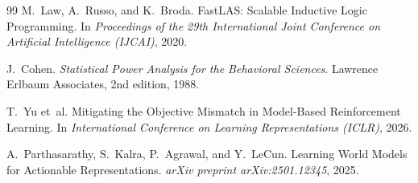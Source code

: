 \documentclass[11pt,a4paper]{article}
\theoremstyle{definition}
\begin{document}
\begin{thebibliography}{99}
M.~Law, A.~Russo, and K.~Broda.
\newblock FastLAS: Scalable Inductive Logic Programming.
\newblock In \emph{Proceedings of the 29th International Joint Conference on Artificial Intelligence (IJCAI)}, 2020.

J.~Cohen.
\newblock \emph{Statistical Power Analysis for the Behavioral Sciences}.
\newblock Lawrence Erlbaum Associates, 2nd edition, 1988.

T.~Yu et~al.
\newblock Mitigating the Objective Mismatch in Model-Based Reinforcement Learning.
\newblock In \emph{International Conference on Learning Representations (ICLR)}, 2026.

A.~Parthasarathy, S.~Kalra, P.~Agrawal, and Y.~LeCun.
\newblock Learning World Models for Actionable Representations.
\newblock \emph{arXiv preprint arXiv:2501.12345}, 2025.
\end{thebibliography}
\end{document}
